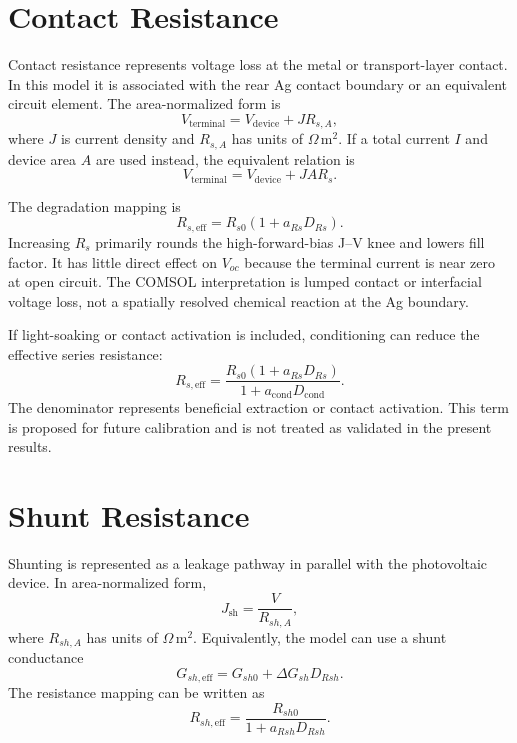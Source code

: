 \section{Contact Resistance}

Contact resistance represents voltage loss at the metal or transport-layer
contact. In this model it is associated with the rear Ag contact boundary or an
equivalent circuit element. The area-normalized form is
\begin{equation}
V_{\mathrm{terminal}} =
V_{\mathrm{device}} + J R_{s,A},
\label{eq:rs_area}
\end{equation}
where $J$ is current density and $R_{s,A}$ has units of $\Omega\,\mathrm{m^2}$.
If a total current $I$ and device area $A$ are used instead, the equivalent
relation is
\begin{equation}
V_{\mathrm{terminal}} =
V_{\mathrm{device}} + J A R_s.
\end{equation}

The degradation mapping is
\begin{equation}
R_{s,\mathrm{eff}} =
R_{s0}\left(1+a_{Rs}D_{Rs}\right).
\label{eq:rs_deg}
\end{equation}
Increasing $R_s$ primarily rounds the high-forward-bias J--V knee and lowers
fill factor. It has little direct effect on $V_{oc}$ because the terminal
current is near zero at open circuit. The COMSOL interpretation is lumped
contact or interfacial voltage loss, not a spatially resolved chemical reaction
at the Ag boundary.

If light-soaking or contact activation is included, conditioning can reduce the
effective series resistance:
\begin{equation}
R_{s,\mathrm{eff}} =
\frac{R_{s0}\left(1+a_{Rs}D_{Rs}\right)}
{1+a_{\mathrm{cond}}D_{\mathrm{cond}}}.
\label{eq:rs_cond}
\end{equation}
The denominator represents beneficial extraction or contact activation. This
term is proposed for future calibration and is not treated as validated in the
present results.

\section{Shunt Resistance}

Shunting is represented as a leakage pathway in parallel with the photovoltaic
device. In area-normalized form,
\begin{equation}
J_{\mathrm{sh}} = \frac{V}{R_{sh,A}},
\label{eq:jsh}
\end{equation}
where $R_{sh,A}$ has units of $\Omega\,\mathrm{m^2}$. Equivalently, the model
can use a shunt conductance
\begin{equation}
G_{sh,\mathrm{eff}}=
G_{sh0}+\Delta G_{sh}D_{Rsh}.
\end{equation}
The resistance mapping can be written as
\begin{equation}
R_{sh,\mathrm{eff}} =
\frac{R_{sh0}}{1+a_{Rsh}D_{Rsh}}.
\label{eq:rsh_deg}
\end{equation}

